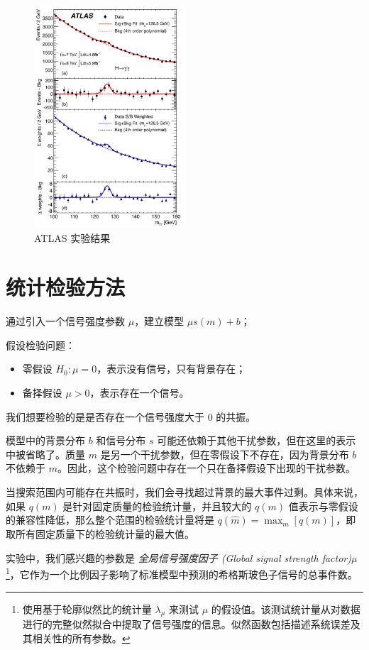 \begin{figure}[htbp]
    \centering
    \includegraphics[width=0.5\textwidth]{pic/atlas.png}
    \caption{ATLAS 实验结果}
    \label{fig:ATLAS}
\end{figure}

\section{统计检验方法}

通过引入一个信号强度参数 $\mu$，建立模型 $\mu s(m) + b$；

假设检验问题：

\begin{itemize}
    \item 零假设 $H_0: \mu=0$，表示没有信号，只有背景存在；
    \item 备择假设 $\mu > 0$，表示存在一个信号。
\end{itemize}

我们想要检验的是是否存在一个信号强度大于 $0$ 的共振。

模型中的背景分布 $b$ 和信号分布 $s$ 可能还依赖于其他干扰参数，但在这里的表示中被省略了。质量 $m$ 是另一个干扰参数，但在零假设下不存在，因为背景分布 $b$ 不依赖于 $m$。因此，这个检验问题中存在一个只在备择假设下出现的干扰参数。

当搜索范围内可能存在共振时，我们会寻找超过背景的最大事件过剩。具体来说，如果 $q(m)$ 是针对固定质量的检验统计量，并且较大的 $q(m)$ 值表示与零假设的兼容性降低，那么整个范围的检验统计量将是 $q(\hat{m})=\max_m ⁡[q(m)]$，即取所有固定质量下的检验统计量的最大值。

实验中，我们感兴趣的参数是 \emph{全局信号强度因子 (Global signal strength factor)}$\mu$ \footnote{使用基于轮廓似然比的统计量 $\lambda_\mu$ 来测试 $\mu$ 的假设值。该测试统计量从对数据进行的完整似然拟合中提取了信号强度的信息。似然函数包括描述系统误差及其相关性的所有参数。}，它作为一个比例因子影响了标准模型中预测的希格斯玻色子信号的总事件数。

